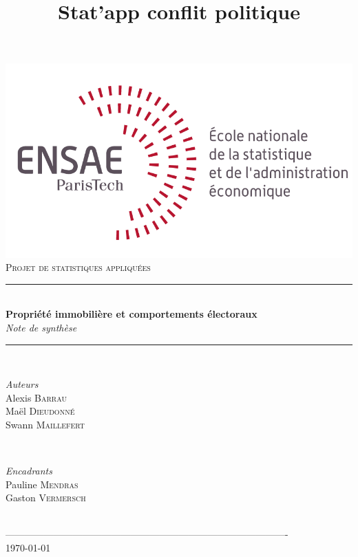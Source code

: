 \documentclass[12pt]{article}
\title{Stat'app conflit politique}
\begin{document}
\begin{titlepage}

\newcommand{\HRule}{\rule{\linewidth}{0.5mm}} %

\center

\includegraphics[scale=1.2]{ensae_logo_dev.png}\\[1cm]
\textsc{\Large Projet de statistiques appliquées}\\[0.5cm]

\HRule \\[0.4cm]
{ \huge \bfseries Propriété immobilière et comportements électoraux}\\[0.4cm]
\emph{\Large Note de synthèse}\\[0.1cm]
\HRule \\[0.6cm]

\begin{minipage}{0.4\textwidth}
\begin{flushleft} \large
\emph{Auteurs}\\
Alexis \textsc{Barrau}\\
Maël \textsc{Dieudonné}\\
Swann \textsc{Maillefert}\\
\end{flushleft}
\end{minipage}\\[1cm]

\begin{minipage}{0.4\textwidth}
\begin{flushleft} \large
\emph{Encadrants}\\
Pauline \textsc{Mendras}\\
Gaston \textsc{Vermersch}\\
\end{flushleft}
\end{minipage}\\[1cm]

 ----------------------------------------------------------------------------------------\\[0.2cm]

{\large \today}\\[2cm]
\vfill

\end{titlepage}
\end{document}
